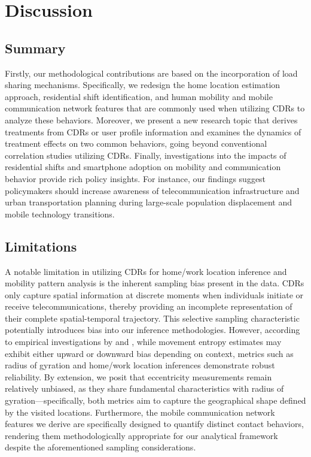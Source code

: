 
\chapter{Discussion}
\section{Summary}
Firstly, our methodological contributions are based on the incorporation of load sharing mechanisms.
Specifically, we redesign the home location estimation approach, residential shift identification, and human mobility and mobile communication network features that are commonly used when utilizing CDRs to analyze these behaviors. Moreover, we present a new research topic that derives treatments from CDRs or user profile information and examines the dynamics of treatment effects on two common behaviors, going beyond conventional correlation studies utilizing CDRs.
Finally, investigations into the impacts of residential shifts and smartphone adoption on mobility and communication behavior provide rich policy insights. For instance, our findings suggest policymakers should increase awareness of telecommunication infrastructure and urban transportation planning during large-scale population displacement and mobile technology transitions.


\section{Limitations}
A notable limitation in utilizing CDRs for home/work location inference and mobility pattern analysis is the inherent sampling bias present in the data.
CDRs only capture spatial information at discrete moments when individuals initiate or receive telecommunications, thereby providing an incomplete representation of their complete spatial-temporal trajectory.
This selective sampling characteristic potentially introduces bias into our inference methodologies.
However, according to empirical investigations by \cite{ranjan2012call} and \cite{zhao2016understanding}, while movement entropy estimates may exhibit either upward or downward bias depending on context, metrics such as radius of gyration and home/work location inferences demonstrate robust reliability.
By extension, we posit that eccentricity measurements remain relatively unbiased, as they share fundamental characteristics with radius of gyration—specifically, both metrics aim to capture the geographical shape defined by the visited locations.
Furthermore, the mobile communication network features we derive are specifically designed to quantify distinct contact behaviors, rendering them methodologically appropriate for our analytical framework despite the aforementioned sampling considerations.

